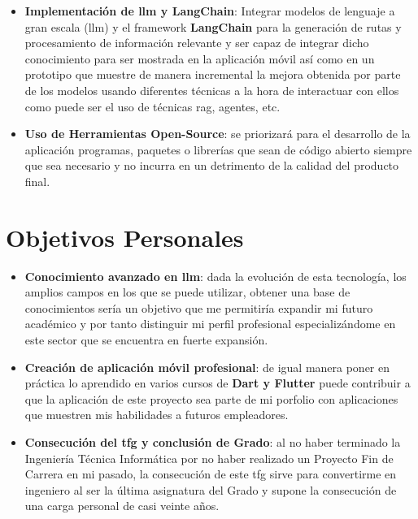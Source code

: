 \begin{itemize}
    \item \textbf{Implementación de \acrfull{llm} y \textbf{LangChain}}: Integrar modelos de lenguaje a gran escala (\acrshort{llm}) y el framework \textbf{LangChain} para la generación de rutas y procesamiento de información relevante y ser capaz de integrar dicho conocimiento para ser mostrada en la aplicación móvil así como en un prototipo que muestre de manera incremental la mejora obtenida por parte de los modelos usando diferentes técnicas a la hora de interactuar con ellos como puede ser el uso de técnicas \acrfull{rag}, agentes, etc.
    \item \textbf{Uso de Herramientas Open-Source}: se priorizará para el desarrollo de la aplicación programas, paquetes o librerías que sean de código abierto siempre que sea necesario y no incurra en un detrimento de la calidad del producto final.
\end{itemize}

\section{Objetivos Personales}

\begin{itemize}
	\item \textbf{Conocimiento avanzado en \acrshort{llm}}: dada la evolución de esta tecnología, los amplios campos en los que se puede utilizar, obtener una base de conocimientos sería un objetivo que me permitiría expandir mi futuro académico y por tanto distinguir mi perfil profesional especializándome en este sector que se encuentra en fuerte expansión.
	\item \textbf{Creación de aplicación móvil profesional}: de igual manera poner en práctica lo aprendido en varios cursos de \textbf{Dart y Flutter} puede contribuir a que la aplicación de este proyecto sea parte de mi porfolio con aplicaciones que muestren mis habilidades a futuros empleadores.
	\item \textbf{Consecución del \acrshort{tfg} y conclusión de Grado}: al no haber terminado la Ingeniería Técnica Informática por no haber realizado un Proyecto Fin de Carrera en mi pasado, la consecución de este \acrshort{tfg} sirve para convertirme en ingeniero al ser la última asignatura del Grado y supone la consecución de una carga personal de casi veinte años.
\end{itemize}
